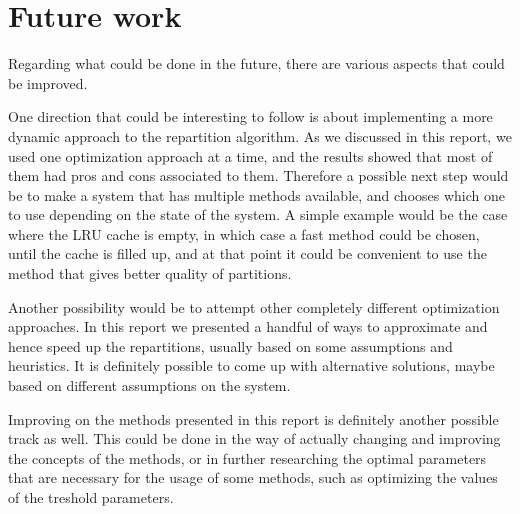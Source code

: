 \section{Future work}\label{sec:future-work}
Regarding what could be done in the future, there are various aspects that could be improved. 

One direction that could be interesting to follow is about implementing a more dynamic approach to the repartition algorithm. As we discussed in this report, we used one optimization approach at a time, and the results showed that most of them had pros and cons associated to them. Therefore a possible next step would be to make a system that has multiple methods available, and chooses which one to use depending on the state of the system. A simple example would be the case where the LRU cache is empty, in which case a fast method could be chosen, until the cache is filled up, and at that point it could be convenient to use the method that gives better quality of partitions.

Another possibility would be to attempt other completely different optimization approaches. In this report we presented a handful of ways to approximate and hence speed up the repartitions, usually based on some assumptions and heuristics. It is definitely possible to come up with alternative solutions, maybe based on different assumptions on the system.

Improving on the methods presented in this report is definitely another possible track as well. This could be done in the way of actually changing and improving the concepts of the methods, or in further researching the optimal parameters that are necessary for the usage of some methods, such as optimizing the values of the treshold parameters.


